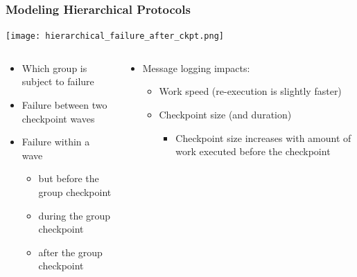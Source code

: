 \begin{frame}
  \frametitle{Modeling Hierarchical Protocols}

  \begin{center}
    \texttt{[image: hierarchical\_failure\_after\_ckpt.png]}
  \end{center}

  \begin{columns}
    \begin{column}{.49\textwidth}
      \begin{itemize}
      \item Which group is subject to failure
      \item Failure between two checkpoint waves
      \item Failure within a wave
        \begin{itemize}
        \item but before the group checkpoint
        \item during the group checkpoint
        \item after the group checkpoint
        \end{itemize}
      \end{itemize}
    \end{column}\begin{column}{.49\textwidth}
      \begin{itemize}
      \item Message logging impacts:
        \begin{itemize}
        \item Work speed (re-execution is slightly faster)
        \item Checkpoint size (and duration)
          \begin{itemize}
          \item Checkpoint size increases with amount of work executed before the checkpoint
          \end{itemize}
        \end{itemize}
      \end{itemize}
    \end{column}
  \end{columns}
  
\end{frame}

